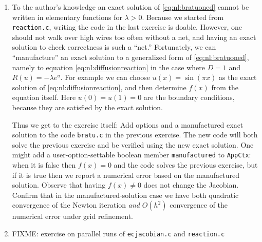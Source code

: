 \begin{enumerate}
\item To the author's knowledge an exact solution of \eqref{eq:nl:bratuoned} cannot be written in elementary functions for $\lambda>0$.  Because we started from \texttt{reaction.c}, writing the code in the last exercise is doable.  However, one should not walk over high wires too often without a net, and having an exact solution to check correctness is such a ``net.''  Fortunately, we can ``manufacture'' \citep{Wesseling2001} an exact solution to a generalized form of \eqref{eq:nl:bratuoned}, namely to equation \eqref{eq:nl:diffusionreaction} in the case where $D=1$ and $R(u)=-\lambda e^u$.  For example we can choose $u(x) = \sin(\pi x)$ as the exact solution of \eqref{eq:nl:diffusionreaction}, and then determine $f(x)$ from the equation itself.  Here $u(0)=u(1)=0$ are the boundary conditions, because they are satisfied by the exact solution.

Thus we get to the exercise itself: Add options and a manufactured exact solution to the code \texttt{bratu.c} in the previous exercise.  The new code will both solve the previous exercise and be verified using the new exact solution.  One might add a user-option-settable boolean member \texttt{manufactured} to \texttt{AppCtx}: when it is false then $f(x)=0$ and the code solves the previous exercise, but if it is true then we report a numerical error based on the manufactured solution.  Observe that having $f(x)\ne 0$ does not change the Jacobian.  Confirm that in the manufactured-solution case we have both quadratic convergence of the Newton iteration \emph{and} $O(h^2)$ convergence of the numerical error under grid refinement.

\item FIXME: exercise on parallel runs of \texttt{ecjacobian.c} and \texttt{reaction.c}

\end{enumerate}
